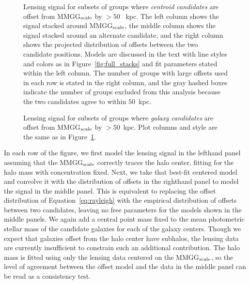 \documentclass[12pt]{emulateapj}
\begin{document}
\begin{figure*}[htb]
\caption{Lensing signal for subsets of groups where \textit{centroid
    candidates} are offset from MMGG$_{\rm scale}$ by $>50$~{\rm
    kpc}. The left column shows the signal stacked around MMGG$_{\rm
    scale}$, the middle column shows the signal stacked around an
  alternate candidate, and the right column shows the projected
  distribution of offsets between the two candidate positions. Models are
  discussed in the text with line styles and colors as in Figure~\ref{fig:full_stacks}
  and fit parameters stated within the left column. The
  number of groups with large offsets used in each row is stated in
  the right column, and the gray hashed boxes indicate the number of
  groups excluded from this analysis because the two candidates agree
  to within $50$~{\rm kpc}.}
\label{fig:diff_stacks_centroids}
\end{figure*}
 
\begin{figure*}[htb]
\caption{Lensing signal for subsets of groups where \textit{galaxy candidates}
  are offset from MMGG$_{\rm scale}$ by $>50$~{\rm kpc}. Plot columns
  and style are the same as in Figure~\ref{fig:diff_stacks_centroids}.}
\label{fig:diff_stacks_galaxies}
\end{figure*}
 
In each row of the figure, we first model the lensing signal in the
lefthand panel assuming that the MMGG$_{\rm scale}$ correctly traces
the halo center, fitting for the halo mass with concentration
fixed. Next, we take that best-fit centered model and convolve it with
the distribution of offsets in the righthand panel to model the signal
in the middle panel. This is equivalent to replacing the offset
distribution of Equation~\eqref{eq:rayleigh} with the empirical
distribution of offsets between two candidates, leaving no free
parameters for the models shown in the middle panels. We again add a
central point mass fixed to the mean photometric stellar mass of the
candidate galaxies for each of the galaxy
centers. Though we expect that galaxies offset from
  the halo center have subhalos, the lensing data are currently insufficient
  to constrain such an additional contribution. The halo mass is
fitted using only the lensing data centered on the MMGG$_{\rm scale}$,
so the level of agreement between the offset model and the data in the
middle panel can be read as a consistency test.
\end{document}
